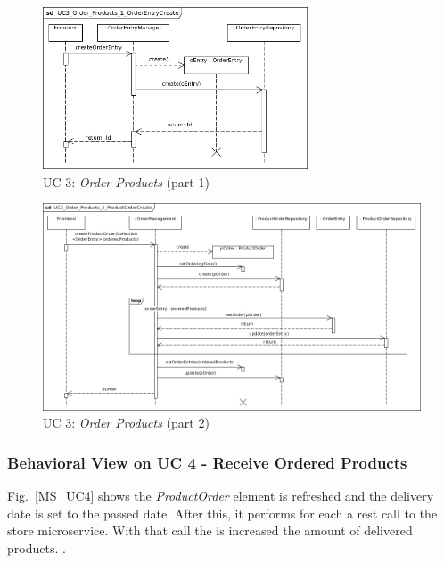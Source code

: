 		
			\begin{figure}[!h]
				\centering
				\includegraphics[width = 0.7\textwidth]{img/UC3_Order_Products_1_OrderEntryCreate.jpg}
				\caption{UC 3: \textit{Order Products} (part 1)}
				\label{MS_UC3_1}
			\end{figure}
			
			\begin{figure}[!h]
				\centering
				\includegraphics[width = 1\textwidth]{img/UC3_Order_Products_2_ProductOrderCreate.jpg}
				\caption{UC 3: \textit{Order Products} (part 2)}
				\label{MS_UC3_2}
			\end{figure}
		
		\subsubsection*{Behavioral View on UC 4 - Receive Ordered Products}
		Fig.~\ref{MS_UC4} shows the \textit{ProductOrder} element
		 is refreshed and the delivery date is set to the passed date.
		After this, it performs for each  a rest call to the store microservice. With that  call the  is increased the amount of delivered products.
		.
			
